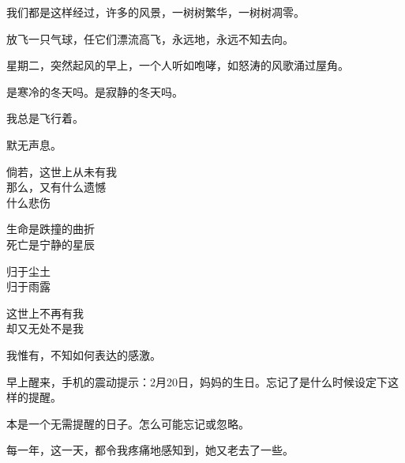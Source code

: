 \documentclass[12pt,a4paper]{article}
\def\blankrev{\vspace{1ex}}									%
\begin{document}
		\blankrev
		我们都是这样经过，许多的风景，一树树繁华，一树树凋零。\par
		放飞一只气球，任它们漂流高飞，永远地，永远不知去向。

		\blankrev
		星期二，突然起风的早上，一个人听如咆哮，如怒涛的风歌涌过屋角。\par
		是寒冷的冬天吗。是寂静的冬天吗。\par
		我总是飞行着。\par
		默无声息。

	\endwriting



		\longpoem{}{}{}

		倘若，这世上从未有我 \\
		那么，又有什么遗憾 \\
		什么悲伤

		生命是跌撞的曲折 \\
		死亡是宁静的星辰

		归于尘土 \\
		归于雨露

		这世上不再有我 \\
		却又无处不是我
		\endlongpoem

	\endwriting



		我惟有，不知如何表达的感激。


		\blankrev
		早上醒来，手机的震动提示：2月20日，妈妈的生日。忘记了是什么时候设定下这样的提醒。\par
		本是一个无需提醒的日子。怎么可能忘记或忽略。\par
		每一年，这一天，都令我疼痛地感知到，她又老去了一些。
\end{document}
